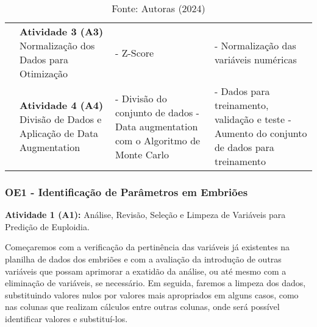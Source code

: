 \begin{table}[h!]
{\begin{tabular}{|p{3cm}|p{4cm}|p{3cm}|p{5cm}|}
      \cline{2-4}

      \cellcolor[HTML]{133e78} & 
      \textcolor[HTML]{133E78}{\textbf{Atividade 3 (A3)}} \newline
      Normalização dos Dados para Otimização &
      - Z-Score &
      - Normalização das variáveis numéricas \\

      \cline{2-4}

      \cellcolor[HTML]{133e78} & 
      \vspace{0.2cm} \textcolor[HTML]{133E78}{\textbf{Atividade 4 (A4)}} \newline
      Divisão de Dados e Aplicação de Data Augmentation \vspace{0.2cm} & 
      - Divisão do conjunto de dados \newline
      - Data augmentation com o Algoritmo de Monte Carlo &
      - Dados para treinamento, validação e teste \newline
      - Aumento do conjunto de dados para treinamento \\

      \hline
    \end{tabular}
  }
  \caption*{\scriptsize Fonte: Autoras (2024)}
\end{table} 
\FloatBarrier  %

\subsubsection{OE1 - Identificação de Parâmetros em Embriões}

\textbf{Atividade 1 (A1):} Análise, Revisão, Seleção e Limpeza de Variáveis para Predição de Euploidia.

Começaremos com a verificação da pertinência das variáveis já existentes na planilha de dados dos embriões e com a avaliação da introdução de outras variáveis que possam aprimorar a exatidão da análise, ou até mesmo com a eliminação de variáveis, se necessário. Em seguida, faremos a limpeza dos dados, substituindo valores nulos por valores mais apropriados em alguns casos, como nas colunas que realizam cálculos entre outras colunas, onde será possível identificar valores e substituí-los.

